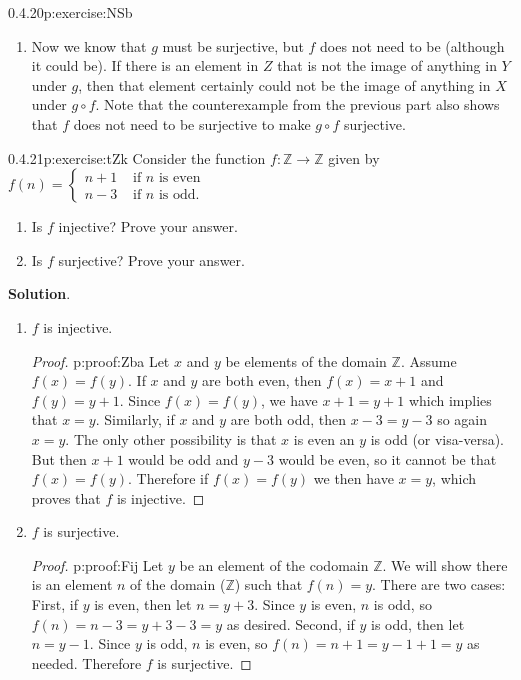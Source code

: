 \documentclass[twoside,11pt,]{book}
\newcommand{\blocktitlefont}{\relax}
\numberwithin{equation}{chapter}
\newcommand{\Z}{\mathbb Z}
\newcommand{\amp}{&}
\begin{document}
\begin{divisionsolution}{0.4.20}{}{p:exercise:NSb}
\begin{enumerate}[label=(\alph*)]
\item{}Now we know that \(g\) must be surjective, but \(f\) does not need to be (although it could be). If there is an element in \(Z\) that is not the image of anything in \(Y\) under \(g\), then that element certainly could not be the image of anything in \(X\) under \(g\circ f\). Note that the counterexample from the previous part also shows that \(f\) does not need to be surjective to make \(g\circ f\) surjective.%
\end{enumerate}
%
\end{divisionsolution}%
\begin{divisionsolution}{0.4.21}{}{p:exercise:tZk}%
Consider the function \(f:\Z \to \Z\) given by \(f(n) = \begin{cases}n+1 \amp \text{ if }n\text{ is even} \\ n-3 \amp \text{ if }n\text{ is odd} . \end{cases}\)%
\begin{enumerate}[label=(\alph*)]
\item{}Is \(f\) injective? Prove your answer.%
\item{}Is \(f\) surjective? Prove your answer.%
\end{enumerate}
%
\par\smallskip%
\noindent\textbf{\blocktitlefont Solution}.\quad{}%
\begin{enumerate}[label=(\alph*)]
\item{}\(f\) is injective.%
\begin{proof}{}{p:proof:Zba}
Let \(x\) and \(y\) be elements of the domain \(\Z\). Assume \(f(x) = f(y)\). If \(x\) and \(y\) are both even, then \(f(x) = x+1\) and \(f(y) = y+1\). Since \(f(x) = f(y)\), we have \(x + 1 = y + 1\) which implies that \(x = y\). Similarly, if \(x\) and \(y\) are both odd, then \(x - 3 = y-3\) so again \(x = y\). The only other possibility is that \(x\) is even an \(y\) is odd (or visa-versa). But then \(x + 1\) would be odd and \(y - 3\) would be even, so it cannot be that \(f(x) = f(y)\). Therefore if \(f(x) = f(y)\) we then have \(x = y\), which proves that \(f\) is injective.%
\end{proof}
\item{}\(f\) is surjective.%
\begin{proof}{}{p:proof:Fij}
Let \(y\) be an element of the codomain \(\Z\). We will show there is an element \(n\) of the domain (\(\Z\)) such that \(f(n) = y\). There are two cases: First, if \(y\) is even, then let \(n = y+3\). Since \(y\) is even, \(n\) is odd, so \(f(n) = n-3 = y+3-3 = y\) as desired. Second, if \(y\) is odd, then let \(n = y-1\). Since \(y\) is odd, \(n\) is even, so \(f(n) = n+1 = y-1+1 = y\) as needed. Therefore \(f\) is surjective.%
\end{proof}
\end{enumerate}
%
\end{divisionsolution}%
\end{document}
